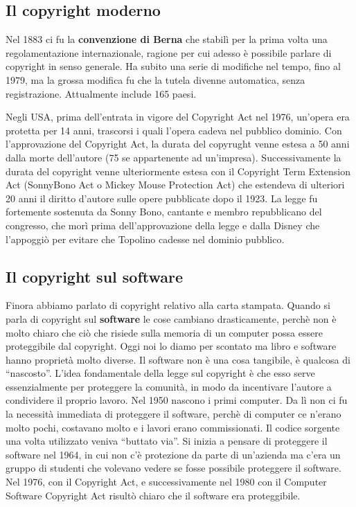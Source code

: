 \subsection{Il copyright moderno}

Nel 1883 ci fu la \textbf{convenzione di Berna} che stabilì per la prima volta una regolamentazione internazionale, ragione per cui adesso è possibile parlare di copyright in senso generale. Ha subito una serie di modifiche nel tempo, fino al 1979, ma la grossa modifica fu che la tutela divenne automatica, senza registrazione. Attualmente include 165 paesi. 

Negli USA, prima dell'entrata in vigore del Copyright Act nel 1976, un'opera era protetta per 14 anni, trascorsi i quali l'opera cadeva nel pubblico dominio. Con l'approvazione del Copyright Act, la durata del copyrught venne estesa a 50 anni dalla morte dell'autore (75 se appartenente ad un'impresa). Successivamente la durata del copyright venne ulteriormente estesa con il Copyright Term Extension Act (SonnyBono Act o Mickey Mouse Protection Act) che estendeva di ulteriori 20 anni il diritto d'autore sulle opere pubblicate dopo il 1923. La legge fu fortemente sostenuta da Sonny Bono, cantante e membro repubblicano del congresso, che morì prima dell'approvazione della legge e dalla Disney che l'appoggiò per evitare che Topolino cadesse nel dominio pubblico.

\subsection{Il copyright sul software}

Finora abbiamo parlato di copyright relativo alla carta stampata. Quando si parla di copyright sul \textbf{software} le cose cambiano drasticamente, perchè non è molto chiaro che ciò che risiede sulla memoria di un computer possa essere proteggibile dal copyright. Oggi noi lo diamo per scontato ma libro e software hanno proprietà molto diverse. Il software non è una cosa tangibile, è qualcosa di ``nascosto''. L'idea fondamentale della legge sul copyright è che esso serve essenzialmente per proteggere la comunità, in modo da incentivare l'autore a condividere il proprio lavoro. Nel 1950 nascono i primi computer. Da lì non ci fu la necessità immediata di proteggere il software, perchè di computer ce n'erano molto pochi, costavano molto e i lavori erano commissionati. Il codice sorgente una volta utilizzato veniva ``buttato via''. Si inizia a pensare di proteggere il software nel 1964, in cui non c'è protezione da parte di un'azienda ma c'era un gruppo di studenti che volevano vedere se fosse possibile proteggere il software. Nel 1976, con il Copyright Act, e successivamente nel 1980 con il Computer Software Copyright Act risultò chiaro che il software era proteggibile. 

